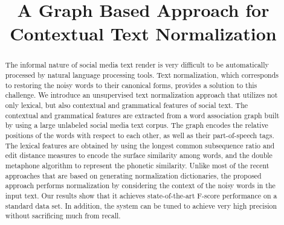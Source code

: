\documentclass[preprint,review,12pt]{elsarticle}
\begin{document}
\begin{frontmatter}



\title{A Graph Based Approach for Contextual Text Normalization}


\author{}

\address{}

\begin{abstract}

The informal nature of social media text render is very difficult to be automatically processed by natural language processing tools. Text normalization, which corresponds to restoring the noisy words to their canonical forms, provides a solution to this challenge.
We introduce an unsupervised text normalization approach that utilizes not only lexical, but also contextual and grammatical features of social text.
The contextual and grammatical features are extracted from a word association graph built by using a large unlabeled social media text corpus.
The graph encodes the relative positions of the words with respect to each other, as well as their part-of-speech tags.
The lexical features are obtained by using the longest common subsequence ratio and edit distance measures to encode the surface similarity among words, and the double metaphone algorithm to represent the phonetic similarity. Unlike most of the recent approaches that are based on generating normalization dictionaries, the proposed approach performs normalization by considering the context of the noisy words in the input text.
Our results show that it achieves state-of-the-art F-score performance on a standard data set. In addition, the system can be tuned to achieve very high precision without sacrificing much from recall.


\end{abstract}
\end{frontmatter}
\end{document}

